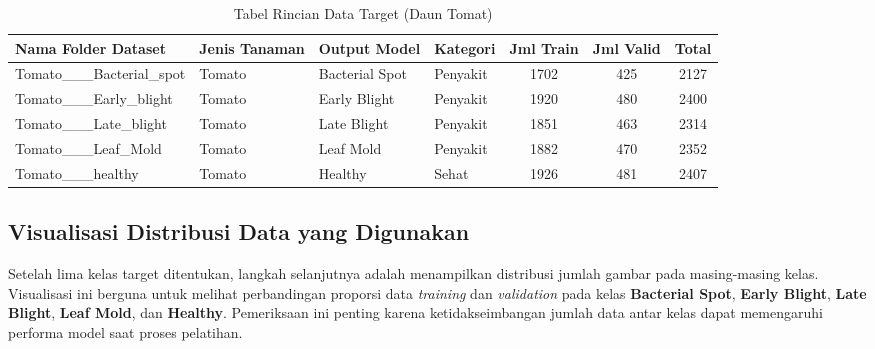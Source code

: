 \begin{table}[H]
\centering
\small
\caption{Tabel Rincian Data Target (Daun Tomat)}
\begin{tabular}{|l|l|l|l|c|c|c|}
\hline
\textbf{Nama Folder Dataset} & \textbf{Jenis Tanaman} & \textbf{Output Model} & \textbf{Kategori} & \textbf{Jml Train} & \textbf{Jml Valid} & \textbf{Total} \\ \hline
Tomato\_\_\_\allowbreak Bacterial\_spot & Tomato & Bacterial Spot & Penyakit & 1702 & 425 & 2127 \\ \hline
Tomato\_\_\_\allowbreak Early\_blight & Tomato & Early Blight & Penyakit & 1920 & 480 & 2400 \\ \hline
Tomato\_\_\_\allowbreak Late\_blight & Tomato & Late Blight & Penyakit & 1851 & 463 & 2314 \\ \hline
Tomato\_\_\_\allowbreak Leaf\_Mold & Tomato & Leaf Mold & Penyakit & 1882 & 470 & 2352 \\ \hline
Tomato\_\_\_\allowbreak healthy & Tomato & Healthy & Sehat & 1926 & 481 & 2407 \\ \hline
\end{tabular}
\end{table}

\subsection{Visualisasi Distribusi Data yang Digunakan}

Setelah lima kelas target ditentukan, langkah selanjutnya adalah menampilkan distribusi jumlah gambar pada masing-masing kelas. Visualisasi ini berguna untuk melihat perbandingan proporsi data \textit{training} dan \textit{validation} pada kelas \textbf{Bacterial Spot}, \textbf{Early Blight}, \textbf{Late Blight}, \textbf{Leaf Mold}, dan \textbf{Healthy}. Pemeriksaan ini penting karena ketidakseimbangan jumlah data antar kelas dapat memengaruhi performa model saat proses pelatihan.

